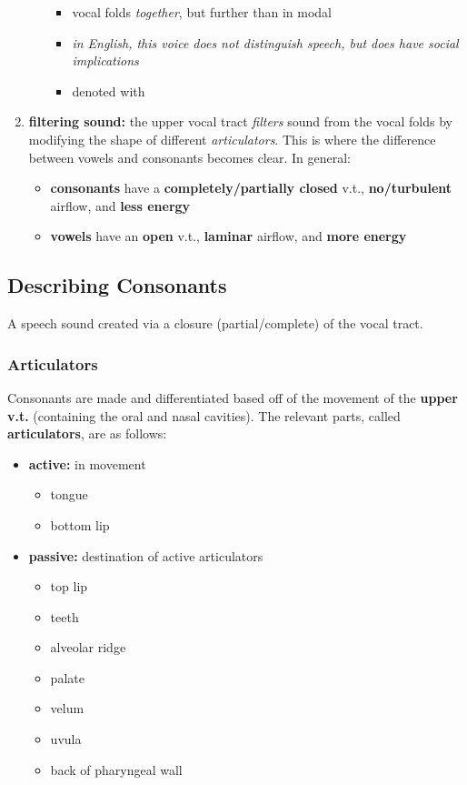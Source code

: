 \documentclass[12pt]{article}
\begin{document}
\begin{enumerate}
\begin{itemize}
\begin{itemize}
      \item vocal folds \textit{together}, but further than in modal
      \item \textit{in English, this voice does not distinguish speech, but does have social implications}
      \item denoted with 
    \end{itemize}
  \end{itemize}
  \item \textbf{filtering sound:} the upper vocal tract \textit{filters} sound from the vocal folds by modifying the shape of different \textit{articulators}. This is where the difference between vowels and consonants becomes clear. In general: \begin{itemize}
    \item \textbf{consonants} have a \textbf{completely/partially closed} v.t., \textbf{no/turbulent} airflow, and \textbf{less energy}
    \item \textbf{vowels} have an \textbf{open} v.t., \textbf{laminar} airflow, and \textbf{more energy}
  \end{itemize}
\end{enumerate}

\subsection{Describing Consonants}

\begin{definitionEnd}[Consonant]
  A speech sound created via a closure (partial/complete) of the vocal tract.
\end{definitionEnd}

\subsubsection{Articulators}
Consonants are made and differentiated based off of the movement of the \textbf{upper v.t.} (containing the oral and nasal cavities). The relevant parts, called \textbf{articulators}, are as follows:

\begin{itemize}
  \item \textbf{active:} in movement \begin{itemize}
    \item tongue
    \item bottom lip
  \end{itemize}
  \item \textbf{passive:} destination of active articulators \begin{itemize}
  \item top lip
  \item teeth
  \item alveolar ridge
  \item palate
  \item velum
  \item uvula
  \item back of pharyngeal wall
  \end{itemize}
\end{itemize}
\end{document}
